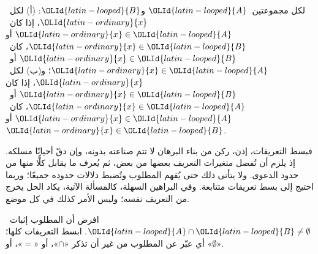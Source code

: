 \documentclass[../../../include/open-logic-section]{subfiles}
\begin{document}
\begin{prop}
لكل مجموعتين~${\OLId{latin-looped}{A}}$ و${\OLId{latin-looped}{B}}$: (أ) لكل~${\OLId{latin-ordinary}{x}}$، إذا كان~${\OLId{latin-ordinary}{x}} \in {\OLId{latin-looped}{A}}$ أو
${\OLId{latin-ordinary}{x}} \in {\OLId{latin-looped}{B}}$، كان~${\OLId{latin-ordinary}{x}} \in {\OLId{latin-looped}{B}}$ أو~${\OLId{latin-ordinary}{x}} \in {\OLId{latin-looped}{A}}$؛ و(ب) لكل~${\OLId{latin-ordinary}{x}}$، إذا كان
${\OLId{latin-ordinary}{x}} \in {\OLId{latin-looped}{B}}$ أو~${\OLId{latin-ordinary}{x}} \in {\OLId{latin-looped}{A}}$، كان~${\OLId{latin-ordinary}{x}} \in {\OLId{latin-looped}{A}}$ أو~${\OLId{latin-ordinary}{x}} \in {\OLId{latin-looped}{B}}$.
\end{prop}

فبسط التعريفات، إذن، ركن من بناء البرهان لا تتم صناعته بدونه، وإن
دقّ أحيانًا مسلكه. إذ يلزم أن تُفصل متغيرات التعريف بعضها من بعض، ثم
يُعرف ما يقابل كلًّا منها من حدود الدعوى. ولا يتأتى ذلك حتى يُفهم
المطلوب وتُضبط دلالات حدوده جميعًا؛ وربما احتيج إلى بسط تعريفات
متتابعة. وفي البراهين السهلة، كالمسألة الآتية، يكاد الحل يخرج من
التعريف نفسه؛ وليس الأمر كذلك في كل موضع.

\begin{prob}
افرض أن المطلوب إثبات~${\OLId{latin-looped}{A}} \cap {\OLId{latin-looped}{B}} \neq \emptyset$. ابسط التعريفات كلها؛
أي عبّر عن المطلوب من غير أن تذكر «$\cap$»، أو «$=$»، أو
«$\emptyset$».
\end{prob}
\end{document}
